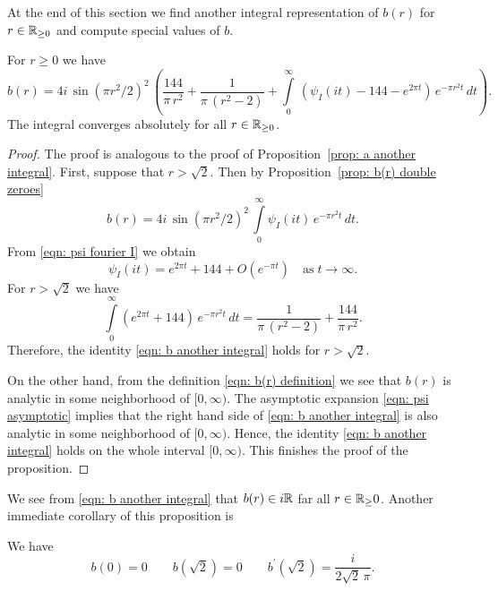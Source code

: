 At the end of this section we find another integral representation of $b(r)$ for $r\in\mathbb{R}_{\geq0}$ and compute special values of $b$.
\begin{proposition}\label{prop: b another integral}
For $r\geq0$ we have
\begin{equation}\label{eqn: b another integral}b(r)=4i\,\sin(\pi r^2/2)^2\,\left(\frac{144}{\pi\,r^2}+\frac{1}{\pi\,(r^2-2)}+\int\limits_0^\infty\,\left(\psi_I(it)-144-e^{2\pi t}\right)\,e^{-\pi r^2 t}\,dt\right).\end{equation}
The integral converges absolutely for all $r\in\mathbb{R}_{\geq 0}$.
\end{proposition}
\begin{proof}
The proof is analogous to the proof of Proposition~\ref{prop: a another integral}.
First, suppose that $r>\sqrt{2}$. Then by Proposition~\ref{prop: b(r) double zeroes}
$$b(r)=4i\,\sin(\pi r^2/2)^2\,\int\limits_{0}^{\infty}\psi_I(it)\,e^{-\pi r^2 t}\,dt. $$
From \eqref{eqn: psi fourier I} we obtain
\begin{equation}\label{eqn: psi asymptotic}
\psi_I(it)=e^{2\pi t}+144+O(e^{-\pi t})\quad\mbox{as}\;t\to\infty.
\end{equation}
For $r>\sqrt{2}$ we have
\begin{equation}
\int\limits_0^\infty \left(e^{2\pi t}+144\right)\,e^{-\pi r^2 t}\,dt
=\frac{1}{\pi\,(r^2-2)}+\frac{144}{\pi\,r^2}.\end{equation}
Therefore, the identity \eqref{eqn: b another integral} holds for $r>\sqrt{2}$.

On the other hand, from the definition \eqref{eqn: b(r) definition} we see that $b(r)$ is analytic in some neighborhood of $[0,\infty)$. The asymptotic expansion \eqref{eqn: psi asymptotic} implies that the right hand side of \eqref{eqn: b another integral} is also analytic in some neighborhood of $[0,\infty)$. Hence, the identity \eqref{eqn: b another integral} holds on the whole interval $[0,\infty)$. This finishes the proof of the proposition.
\end{proof}
We see from \eqref{eqn: b another integral} that $b(r)\in i\mathbb{R}$ far all $r\in\mathbb{R}_\geq{0}$. Another immediate corollary of this proposition is
\begin{proposition}\label{prop: b values}
We have
\begin{equation}\label{eqn: b values}
b(0)=0\qquad
b(\sqrt{2})=0\qquad
b^\prime(\sqrt{2})=\frac{i}{2\sqrt{2}\,\pi}.
\end{equation}
\end{proposition}

